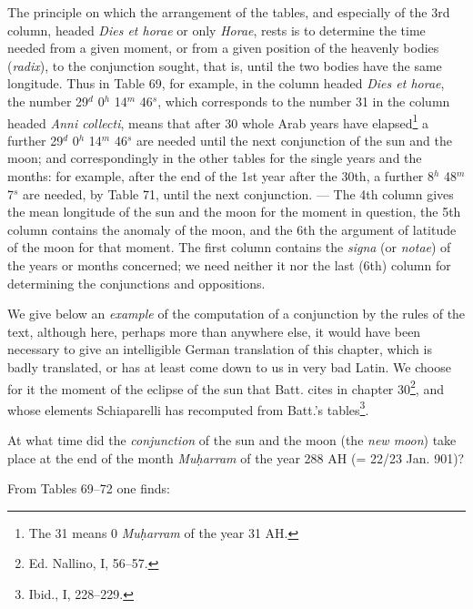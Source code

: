 \documentclass[11pt]{article}
\newcommand{\Pg}[1]{\marginpar{\footnotesize\color{gray}#1}}
\begin{document}
\par \Pg{82}The principle on which the arrangement of the tables, and especially of the 3rd column, headed \emph{Dies et horae} or only \emph{Horae}, rests is to determine the time needed from a given moment, or from a given position of the heavenly bodies (\emph{radix}), to the conjunction sought, that is, until the two bodies have the same longitude. Thus in Table 69, for example, in the column headed \emph{Dies et horae}, the number 29$^{d}$ 0$^{h}$ 14$^{m}$ 46$^{s}$, which corresponds to the number 31 in the column headed \emph{Anni collecti}, means that after 30 whole Arab years have elapsed\footnote{The 31 means 0 \emph{Muḥarram} of the year 31 AH.} a further 29$^{d}$ 0$^{h}$ 14$^{m}$ 46$^{s}$ are needed until the next conjunction of the sun and the moon; and correspondingly in the other tables for the single years and the months: for example, after the end of the 1st year after the 30th, a further 8$^{h}$ 48$^{m}$ 7$^{s}$ are needed, by Table 71, until the next conjunction. — The 4th column gives the mean longitude of the sun and the moon for the moment in question, the 5th column contains the anomaly of the moon, and the 6th the argument of latitude of the moon for that moment. The first column contains the \emph{signa} (or \emph{notae}) of the years or months concerned; we need neither it nor the last (6th) column for determining the conjunctions and oppositions.\par
\par We give below an \emph{example} of the computation of a conjunction by the rules of the text, although here, perhaps more than anywhere else, it would have been necessary to give an intelligible German translation of this chapter, which is badly translated, or has at least come down to us in very bad Latin. We choose for it the moment of the eclipse of the sun that Batt. cites in chapter 30\footnote{Ed. Nallino, I, 56–57.}, and whose elements Schiaparelli has recomputed from Batt.'s tables\footnote{Ibid., I, 228–229.}.\par
\par At what time did the \emph{conjunction} of the sun and the moon (the \emph{new moon}) take place at the end of the month \emph{Muḥarram} of the year 288 AH (= 22/23 Jan. 901)?\par
\par From Tables 69–72 one finds:\par
\end{document}
